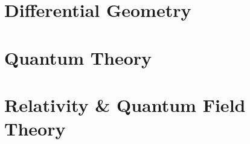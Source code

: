 \documentclass[12pt, a4paper]{report}
\begin{document}
\part{Differential Geometry}\label{part:diffgeom}
% 
% 
% 
% 
% 
% 
% 
% 
% 
% 
% 

% 
% 



% 
% 
% 
% 
% 
% 
% 
% 

% 

% 
% 

\part{Quantum Theory}
% 
% 
% 


% 

% 
% 
% 
% 

\part{Relativity \& Quantum Field Theory}
% 



% 
% 

% 

% 

% 
% 

\printnomenclature




\printindex
\end{document}
